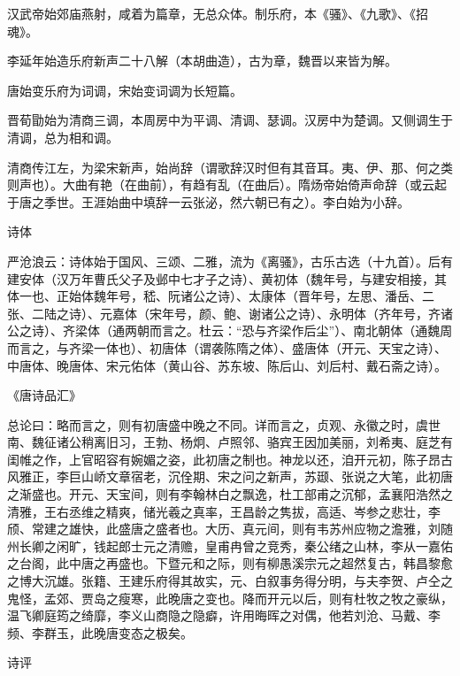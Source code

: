 \documentclass[a4paper,12pt,UTF8,twoside]{ctexbook}
\begin{document}
    汉武帝始郊庙燕射，咸着为篇章，无总众体。制乐府，本《骚》、《九歌》、《招魂》。
    
    李延年始造乐府新声二十八解（本胡曲造），古为章，魏晋以来皆为解。
    
    唐始变乐府为词调，宋始变词调为长短篇。
    
    晋荀勖始为清商三调，本周房中为平调、清调、瑟调。汉房中为楚调。又侧调生于清调，总为相和调。
    
    清商传江左，为梁宋新声，始尚辞（谓歌辞汉时但有其音耳。夷、伊、那、何之类则声也）。大曲有艳（在曲前），有趋有乱（在曲后）。隋炀帝始倚声命辞（或云起于唐之季世。王涯始曲中填辞一云张泌，然六朝已有之）。李白始为小辞。
    
    诗体
    
    严沧浪云：诗体始于国风、三颂、二雅，流为《离骚》，古乐古选（十九首）。后有建安体（汉万年曹氏父子及邺中七才子之诗）、黄初体（魏年号，与建安相接，其体一也、正始体魏年号，嵇、阮诸公之诗）、太康体（晋年号，左思、潘岳、二张、二陆之诗）、元嘉体（宋年号，颜、鲍、谢诸公之诗）、永明体（齐年号，齐诸公之诗）、齐梁体（通两朝而言之。杜云：“恐与齐梁作后尘”）、南北朝体（通魏周而言之，与齐梁一体也）、初唐体（谓袭陈隋之体）、盛唐体（开元、天宝之诗）、中唐体、晚唐体、宋元佑体（黄山谷、苏东坡、陈后山、刘后村、戴石斋之诗）。
    
    《唐诗品汇》
    
    总论曰：略而言之，则有初唐盛中晚之不同。详而言之，贞观、永徽之时，虞世南、魏征诸公稍离旧习，王勃、杨炯、卢照邻、骆宾王因加美丽，刘希夷、庭芝有闺帷之作，上官昭容有婉媚之姿，此初唐之制也。神龙以还，洎开元初，陈子昂古风雅正，李巨山峤文章宿老，沉佺期、宋之问之新声，苏颋、张说之大笔，此初唐之渐盛也。开元、天宝间，则有李翰林白之飘逸，杜工部甫之沉郁，孟襄阳浩然之清雅，王右丞维之精爽，储光羲之真率，王昌龄之隽拔，高适、岑参之悲壮，李颀、常建之雄快，此盛唐之盛者也。大历、真元间，则有韦苏州应物之澹雅，刘随州长卿之闲旷，钱起郎士元之清赡，皇甫冉曾之竞秀，秦公绪之山林，李从一嘉佑之台阁，此中唐之再盛也。下暨元和之际，则有柳愚溪宗元之超然复古，韩昌黎愈之博大沉雄。张籍、王建乐府得其故实，元、白叙事务得分明，与夫李贺、卢仝之鬼怪，孟郊、贾岛之瘦寒，此晚唐之变也。降而开元以后，则有杜牧之牧之豪纵，温飞卿庭筠之绮靡，李义山商隐之隐癖，许用晦晖之对偶，他若刘沧、马戴、李频、李群玉，此晚唐变态之极矣。
    
    诗评
    
\end{document}

